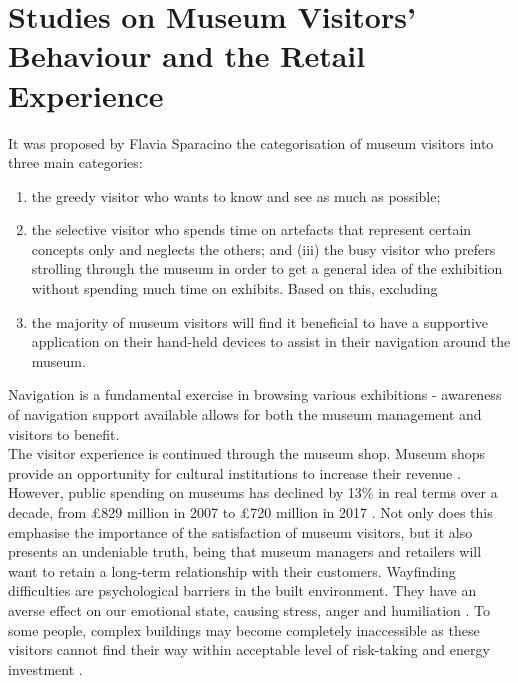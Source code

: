 \section{Studies on Museum Visitors' Behaviour and the Retail Experience}
It was proposed by Flavia Sparacino \cite{sparacino} the categorisation of museum visitors into three main categories: 

\begin{enumerate}
\item the greedy visitor who wants to know and see as much as possible;
\item the selective visitor who spends time on artefacts that represent certain concepts only and neglects the others; and (iii) the busy visitor who prefers strolling through the museum in order to get a general idea of the exhibition without spending much time on exhibits. Based on this, excluding  
\item the majority of museum visitors will find it beneficial to have a supportive application on their hand-held devices to assist in their navigation around the museum.
\end{enumerate}
Navigation is a fundamental exercise in browsing various exhibitions - awareness of navigation support available allows for both the museum management and visitors to benefit.\\

The visitor experience is continued through the museum shop. Museum shops provide an opportunity for cultural institutions to increase their revenue \cite{murphy}. However, public spending on museums has declined by 13\% in real terms over a decade, from £829 million in 2007 to £720 million in 2017 \cite{pickford}. Not only does this emphasise the importance of the satisfaction of museum visitors, but it also presents an undeniable truth, being that museum managers and retailers will want to retain a long-term relationship with their customers. Wayfinding difficulties are psychological barriers in the built environment. They have an averse effect on our emotional state, causing stress, anger and humiliation \cite{Ecology}. To some people, complex buildings may become completely inaccessible as these visitors cannot find their way within acceptable level of risk-taking and energy investment \cite{Wayfinding}. 

